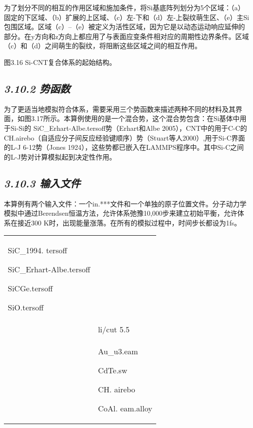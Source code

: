 为了划分不同的相互的作用区域和施加条件，将Si基底阵列划分为5个区域：（a）固定的下区域、（b）扩展的上区域、（c）左-下和（d）左-上裂纹萌生区、（e）主Si包围区域。区域（c）--（e）被定义为活性区域，因为它是以动态运动响应延伸的部分。在y方向和z方向上都应用了与表面应变条件相对应的周期性边界条件。区域（c）和（d）之间萌生的裂纹，将阻断这些区域之间的相互作用。


图3.16 Si-CNT复合体系的起始结构。

\hypertarget{ux52bfux51fdux6570}{%
\subsection{\texorpdfstring{\emph{3.10.2
势函数}}{3.10.2 势函数}}\label{ux52bfux51fdux6570}}

为了更适当地模拟符合体系，需要采用三个势函数来描述两种不同的材料及其界面，如图3.17所示。本算例使用的是一个混合势，这个混合势包含：在Si基体中用于Si-Si的
SiC\_Erhart-Albe.tersoff势（Erhart和Albe
2005），CNT中的用于C-C的CH.airebo（自适应分子间反应经验键顺序）势（Stuart等人2000）,用于Si-C界面的L-J
6-12势（Jones
1924），这些势都已嵌入在LAMMPS程序中。其中Si-C之间的L-J势对计算模拟起到决定性作用。

\hypertarget{ux8f93ux5165ux6587ux4ef6-8}{%
\subsection{\texorpdfstring{\emph{3.10.3
输入文件}}{3.10.3 输入文件}}\label{ux8f93ux5165ux6587ux4ef6-8}}

本算例有两个输入文件：一个in.***文件和一个单独的原子位置文件。分子动力学模拟中通过Berendsen恒温方法，允许体系弛豫10,000步来建立初始平衡，允许体系在接近300
K时，出现能量涨落。在所有的模拟过程中，时间步长都设为1fs。

\begin{longtable}[]{@{}
  >{\raggedright\arraybackslash}p{}
  >{\raggedright\arraybackslash}p{}@{}}
\toprule
\endhead
SiC\_1994. tersoff

SiC\_Erhart-Albe.tersoff

SiCGe.tersoff

SiO.tersoff \\
& li/cut 5.5 \\
& Au\_u3.eam

CdTe.sw

CH. airebo

CoAl. eam.alloy \\
\bottomrule
\end{longtable}

